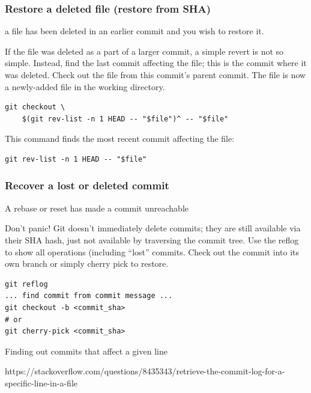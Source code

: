 \documentclass{git_course}
\begin{document}
\begin{frame}[fragile]
    \frametitle{Restore a deleted file (restore from SHA)}
     a file has been deleted in an earlier commit and you wish
    to restore it.

     If the file was deleted as a part of a larger commit, a
    simple revert is not so simple.  Instead, find the last commit affecting
    the file; this is the commit where it was deleted.  Check out the file
    from this commit's parent commit.  The file is now a newly-added file in
    the working directory.

\begin{lstlisting}
git checkout \
    $(git rev-list -n 1 HEAD -- "$file")^ -- "$file"
\end{lstlisting}

This command finds the most recent commit affecting the file:
\begin{lstlisting}
git rev-list -n 1 HEAD -- "$file"
\end{lstlisting}

\end{frame}

\begin{frame}[fragile]
    \frametitle{Recover a lost or deleted commit}
     A rebase or reset has made a commit unreachable

     Don't panic! Git doesn't immediately delete commits;
    they are still available via their SHA hash, just not available by
    traversing the commit tree.  Use the reflog to show all operations
    (including ``lost'' commits.  Check out the commit into its own branch
    or simply cherry pick to restore.
\begin{lstlisting}
git reflog
... find commit from commit message ...
git checkout -b <commit_sha>
# or
git cherry-pick <commit_sha>
\end{lstlisting}

\end{frame}




Finding out commits that affect a given line

https://stackoverflow.com/questions/8435343/retrieve-the-commit-log-for-a-specific-line-in-a-file
\end{document}
